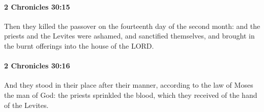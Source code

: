		\paragraph{2 Chronicles 30:15} %
			\label{2CHRONICLES-30-15}

			Then they killed the passover on the fourteenth day of the second month: and the priests and the Levites were ashamed, and sanctified themselves, and brought in the burnt offerings into the house of the LORD.


		\paragraph{2 Chronicles 30:16} %
			\label{2CHRONICLES-30-16}

			And they stood in their place after their manner, according to the law of Moses the man of God: the priests sprinkled the blood, which they received of the hand of the Levites.

